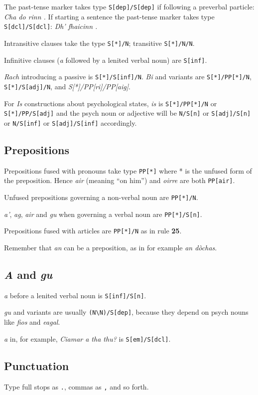 \documentclass[a4paper]{article}
\begin{document}
 The past-tense marker takes type \texttt{S[dep]/S[dep]} if following a preverbal particle: \textit{Cha do rinn .}
If starting a sentence the past-tense marker takes type \texttt{S[dcl]/S[dcl]}: \textit{Dh' fhaicinn .}

 Intransitive clauses take the type \texttt{S[*]/N}; transitive \texttt{S[*]/N/N}.

 Infinitive clauses (\textit{a} followed by a lenited verbal noun) are \texttt{S[inf]}.

 \textit{Rach} introducing a passive is \texttt{S[*]/S[inf]/N}.
 \textit{Bi} and variants are \texttt{S[*]/PP[*]/N}, \texttt{S[*]/S[adj]/N}, and \textit{S[*]/PP[ri]/PP[aig]}.

 For \textit{Is} constructions about psychological states, \textit{is} is \texttt{S[*]/PP[*]/N} or \texttt{S[*]/PP/S[adj]} and the psych noun or adjective will be \texttt{N/S[n]} or \texttt{S[adj]/S[n]} or \texttt{N/S[inf]} or \texttt{S[adj]/S[inf]} accordingly.

\subsection{Prepositions}

 Prepositions fused with pronouns take type \texttt{PP[*]} where * is the unfused form of the preposition.
Hence \textit{air} (meaning ``on him'') and \textit{oirre} are both \texttt{PP[air]}.

 Unfused prepositions governing a non-verbal noun are \texttt{PP[*]/N}.

 \textit{a'}, \textit{ag}, \textit{air} and \textit{gu} when governing a verbal noun are \texttt{PP[*]/S[n]}.

 Prepositions fused with articles are \texttt{PP[*]/N} as in rule {\bf 25}.

 Remember that \textit{an} can be a preposition, as in for example \textit{an d\`ochas}.

\subsection{\textit{A} and \textit{gu}}

 \textit{a} before a lenited verbal noun is \texttt{S[inf]/S[n]}.

 \textit{gu} and variants are usually \texttt{(N\textbackslash N)/S[dep]}, because they depend on psych nouns like \textit{fios} and \textit{eagal}.

 \textit{a} in, for example, \textit{Ciamar a tha thu?} is \texttt{S[em]/S[dcl]}.

\subsection{Punctuation}

 Type full stops as \texttt{.}, commas as \texttt{,} and so forth.
\end{document}
